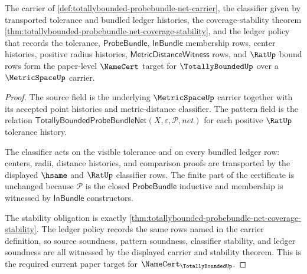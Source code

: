 \begin{theorem}
\label{thm:totallybounded-probebundle-net-namecert-target}
The carrier of \autoref{def:totallybounded-probebundle-net-carrier}, the
classifier given by transported tolerance and bundled ledger histories, the
coverage-stability theorem
\autoref{thm:totallybounded-probebundle-net-coverage-stability}, and the
ledger policy that records the tolerance, $\mathsf{ProbeBundle}$,
$\mathsf{InBundle}$ membership rows, center histories, positive radius
histories, $\mathsf{MetricDistanceWitness}$ rows, and $\RatUp$ bound rows form
the paper-level $\NameCert$ target for $\TotallyBoundedUp$ over a
$\MetricSpaceUp$ carrier.
\end{theorem}
\begin{proof}
The source field is the underlying $\MetricSpaceUp$ carrier together with its
accepted point histories and metric-distance classifier. The pattern field is
the relation
$\mathsf{TotallyBoundedProbeBundleNet}(X,\varepsilon,\mathcal{P},net)$ for
each positive $\RatUp$ tolerance history.

The classifier acts on the visible tolerance and on every bundled ledger row:
centers, radii, distance histories, and comparison proofs are transported by
the displayed $\hsame$ and $\RatUp$ classifier rows. The finite part of the
certificate is unchanged because $\mathcal{P}$ is the closed
$\mathsf{ProbeBundle}$ inductive and membership is witnessed by
$\mathsf{InBundle}$ constructors.

The stability obligation is exactly
\autoref{thm:totallybounded-probebundle-net-coverage-stability}. The ledger
policy records the same rows named in the carrier definition, so source
soundness, pattern soundness, classifier stability, and ledger soundness are
all witnessed by the displayed carrier and stability theorem. This is the
required current paper target for $\NameCert_{\TotallyBoundedUp}$.
\end{proof}

